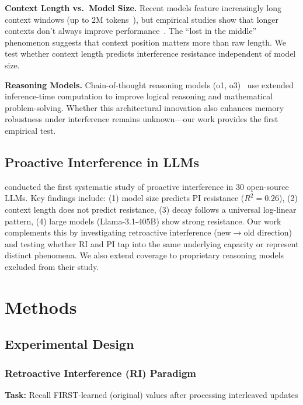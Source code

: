 \documentclass{article}
\begin{document}
\textbf{Context Length vs.\ Model Size.} Recent models feature increasingly long context windows (up to 2M tokens~\citep{gemini2023}), but empirical studies show that longer contexts don't always improve performance~\citep{liu2024lost}. The ``lost in the middle'' phenomenon suggests that context position matters more than raw length. We test whether context length predicts interference resistance independent of model size.

\textbf{Reasoning Models.} Chain-of-thought reasoning models (o1, o3)~\citep{openai2024o1} use extended inference-time computation to improve logical reasoning and mathematical problem-solving. Whether this architectural innovation also enhances memory robustness under interference remains unknown---our work provides the first empirical test.

\subsection{Proactive Interference in LLMs}

\citet{liu2024unable} conducted the first systematic study of proactive interference in 30 open-source LLMs. Key findings include: (1) model size predicts PI resistance ($R^2 = 0.26$), (2) context length does not predict resistance, (3) decay follows a universal log-linear pattern, (4) large models (Llama-3.1-405B) show strong resistance. Our work complements this by investigating retroactive interference (new$\rightarrow$old direction) and testing whether RI and PI tap into the same underlying capacity or represent distinct phenomena. We also extend coverage to proprietary reasoning models excluded from their study.

\section{Methods}

\subsection{Experimental Design}

\subsubsection{Retroactive Interference (RI) Paradigm}

\textbf{Task:} Recall FIRST-learned (original) values after processing interleaved updates
\end{document}
